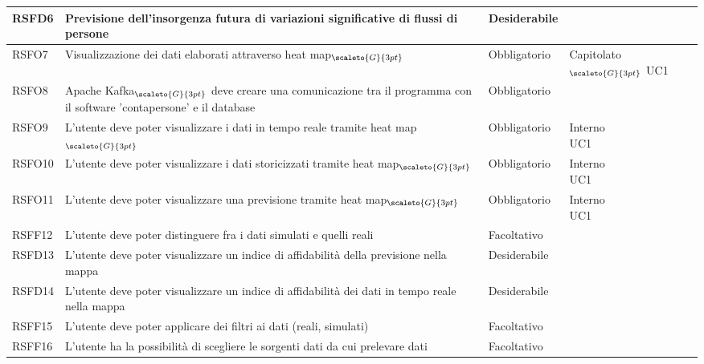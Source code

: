 {\begin{center}
\begin{longtable}{|p{3cm}|p{4cm}|p{4cm}|p{4cm}|}
			\hline
			\centering RSFD6 & Previsione dell'insorgenza futura di variazioni significative di flussi di persone & \centering Desiderabile & \makecell[tc]{Capitolato$_{\scaleto{G}{3pt}}$ }  \\
			\hline
			\centering RSFO7 & Visualizzazione dei dati elaborati attraverso heat map$_{\scaleto{G}{3pt}}$ &\centering  Obbligatorio & \makecell[tc]{Capitolato$_{\scaleto{G}{3pt}}$ \\ UC1}  \\
			\hline
			\centering RSFO8 & Apache Kafka$_{\scaleto{G}{3pt}}$ deve creare una comunicazione tra il programma con il software 'contapersone' e il database  &\centering  Obbligatorio &  \makecell[tc]{Interno} 	\\
			\hline
			\centering RSFO9 & L'utente deve poter visualizzare i dati in tempo reale tramite heat map$_{\scaleto{G}{3pt}}$  &\centering  Obbligatorio &  \makecell[tc]{Interno \\ UC1} 	\\
			\hline
			\centering RSFO10 & L'utente deve poter visualizzare i dati storicizzati tramite heat map$_{\scaleto{G}{3pt}}$  &\centering  Obbligatorio &  \makecell[tc]{Interno \\ UC1} 	\\
			\hline
			\centering RSFO11 & L'utente deve poter visualizzare una previsione tramite heat map$_{\scaleto{G}{3pt}}$  &\centering  Obbligatorio &  \makecell[tc]{Interno \\ UC1} 	\\
			\hline
			\centering RSFF12 & L'utente deve poter distinguere fra i dati simulati e quelli reali  &\centering  Facoltativo &  \makecell[tc]{Interno} 	\\
			\hline
			\centering RSFD13 & L'utente deve poter visualizzare un indice di affidabilità della previsione nella mappa  &\centering  Desiderabile &  \makecell[tc]{Interno} 	\\ 
			\hline
			\centering RSFD14 & L'utente deve poter visualizzare un indice di affidabilità dei dati in tempo reale nella mappa  &\centering  Desiderabile &  \makecell[tc]{Interno} 	\\
			\hline
			\centering RSFF15 & L'utente deve poter applicare dei filtri ai dati (reali, simulati)  &\centering  Facoltativo &  \makecell[tc]{Interno } 	\\
			\hline
			\centering RSFF16 & L'utente ha la possibilità di scegliere le sorgenti dati da cui prelevare dati  &\centering  Facoltativo &  \makecell[tc]{Interno} 	\\

\end{longtable}
\end{center}}

